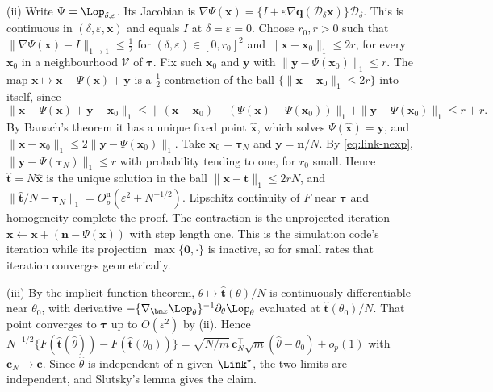 (ii) Write $\Psi=\Lop_{\delta,\varepsilon}$. Its Jacobian is $\nabla\Psi(\bm x)=\{I+\varepsilon\nabla\bm q(\mathcal D_\delta\bm x)\}\mathcal D_\delta$. This is continuous in $(\delta,\varepsilon,\bm x)$ and equals $I$ at $\delta=\varepsilon=0$. Choose $r_0,r>0$ such that $\|\nabla\Psi(\bm x)-I\|_{1\to1}\le\frac12$ for $(\delta,\varepsilon)\in[0,r_0]^2$ and $\|\bm x-\bm x_0\|_1\le2r$, for every $\bm x_0$ in a neighbourhood $\mathcal V$ of $\bm\tau$. Fix such $\bm x_0$ and $\bm y$ with $\|\bm y-\Psi(\bm x_0)\|_1\le r$. The map $\bm x\mapsto\bm x-\Psi(\bm x)+\bm y$ is a $\frac12$-contraction of the ball $\{\|\bm x-\bm x_0\|_1\le2r\}$ into itself, since
\[
  \|\bm x-\Psi(\bm x)+\bm y-\bm x_0\|_1\le\|(\bm x-\bm x_0)-(\Psi(\bm x)-\Psi(\bm x_0))\|_1+\|\bm y-\Psi(\bm x_0)\|_1\le r+r .
\]
By Banach's theorem it has a unique fixed point $\hat{\bm x}$, which solves $\Psi(\hat{\bm x})=\bm y$, and $\|\hat{\bm x}-\bm x_0\|_1\le2\|\bm y-\Psi(\bm x_0)\|_1$. Take $\bm x_0=\bm\tau_N$ and $\bm y=\bm n/N$. By \eqref{eq:link-nexp}, $\|\bm y-\Psi(\bm\tau_N)\|_1\le r$ with probability tending to one, for $r_0$ small. Hence $\hat{\bm t}=N\hat{\bm x}$ is the unique solution in the ball $\|\bm x-\bm t\|_1\le2rN$, and $\|\hat{\bm t}/N-\bm\tau_N\|_1=O_p^{\mathrm u}(\varepsilon^2+N^{-1/2})$. Lipschitz continuity of $F$ near $\bm\tau$ and homogeneity complete the proof. The contraction is the unprojected iteration $\bm x\gets\bm x+(\bm n-\Psi(\bm x))$ with step length one. This is the simulation code's iteration while its projection $\max\{\bm0,\cdot\}$ is inactive, so for small rates that iteration converges geometrically.

(iii) By the implicit function theorem, $\theta\mapsto\hat{\bm t}(\theta)/N$ is continuously differentiable near $\theta_0$, with derivative $-\{\nabla_{\bm x}\Lop_\theta\}^{-1}\partial_\theta\Lop_\theta$ evaluated at $\hat{\bm t}(\theta_0)/N$. That point converges to $\bm\tau$ up to $O(\varepsilon^2)$ by (ii). Hence $N^{-1/2}\{F(\hat{\bm t}(\hat\theta))-F(\hat{\bm t}(\theta_0))\}=\sqrt{N/m}\,\bm c_N^{\top}\sqrt m(\hat\theta-\theta_0)+o_p(1)$ with $\bm c_N\to\bm c$. Since $\hat\theta$ is independent of $\bm n$ given $\Link^\star$, the two limits are independent, and Slutsky's lemma gives the claim.


